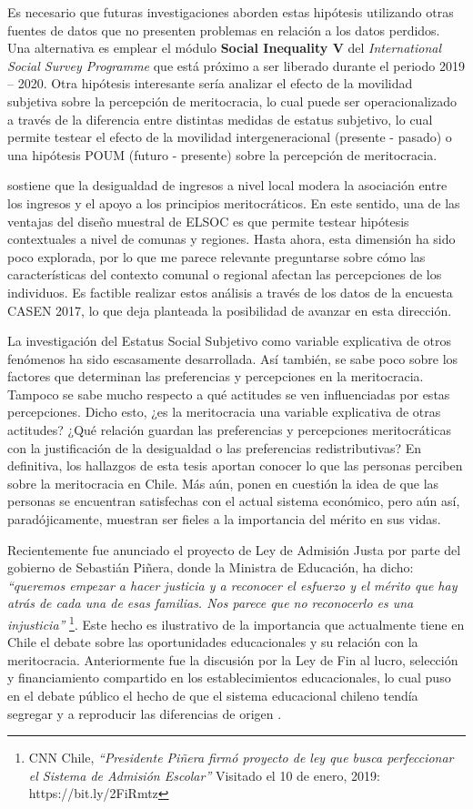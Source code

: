 \documentclass[12pt]{article}
\begin{document}
Es necesario que futuras investigaciones aborden estas hipótesis utilizando otras fuentes de datos que no presenten problemas en relación a los datos perdidos. Una alternativa es emplear el módulo \textbf{Social Inequality V} del \textit{International Social Survey Programme} que está próximo a ser liberado durante el periodo 2019 -- 2020. Otra hipótesis interesante sería analizar el efecto de la movilidad subjetiva sobre la percepción de meritocracia, lo cual puede ser operacionalizado a través de la diferencia entre distintas medidas de estatus subjetivo, lo cual permite testear el efecto de la movilidad intergeneracional (presente - pasado) o una hipótesis  POUM (futuro - presente) sobre la percepción de meritocracia. 

\cite{Solt2016} sostiene que la desigualdad de ingresos a nivel local modera la asociación entre los ingresos y el apoyo a los principios meritocráticos. En este sentido, una de las ventajas del diseño muestral de ELSOC es que permite testear hipótesis contextuales a nivel de comunas y regiones. Hasta ahora, esta dimensión ha sido poco explorada, por lo que me parece relevante preguntarse sobre cómo las características del contexto comunal o regional afectan las percepciones de los individuos. Es factible realizar estos análisis a través de los datos de la encuesta CASEN 2017, lo que deja planteada la posibilidad de avanzar en esta dirección.

La investigación del Estatus Social Subjetivo como variable explicativa de otros fenómenos ha sido escasamente desarrollada. Así también, se sabe poco sobre los factores que determinan las preferencias y percepciones en la meritocracia. Tampoco se sabe mucho respecto a qué actitudes se ven influenciadas por estas percepciones. Dicho esto, ¿es la meritocracia una variable explicativa de otras actitudes? ¿Qué relación guardan las preferencias y percepciones meritocráticas con la justificación de la desigualdad o las preferencias redistributivas? En definitiva, los hallazgos de esta tesis aportan conocer lo que las personas perciben sobre la meritocracia en Chile. Más aún, ponen en cuestión la idea de que las personas se encuentran satisfechas con el actual sistema económico, pero aún así, paradójicamente, muestran ser fieles a la importancia del mérito en sus vidas. 

Recientemente fue anunciado el proyecto de Ley de Admisión Justa por parte del gobierno de Sebastián Piñera, donde la Ministra de Educación, ha dicho: \textit{``queremos empezar a hacer justicia y a reconocer el esfuerzo y el mérito que hay atrás de cada una de esas familias. Nos parece que no reconocerlo es una injusticia''} \footnote{CNN Chile, \textit{``Presidente Piñera firmó proyecto de ley que busca perfeccionar el Sistema de Admisión Escolar''} Visitado el 10 de enero, 2019: https://bit.ly/2FiRmtz }. Este hecho es ilustrativo de la importancia que actualmente tiene en Chile el debate sobre las oportunidades educacionales y su relación con la meritocracia. Anteriormente fue la discusión por la Ley de Fin al lucro, selección y financiamiento compartido en los establecimientos educacionales, lo cual puso en el debate público el hecho de que el sistema educacional chileno tendía segregar y a reproducir las diferencias de origen \citep{Bellei2015}.    
\end{document}
